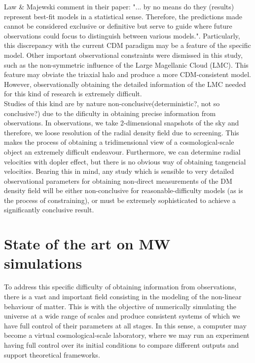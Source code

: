 Law \& Majewski comment in their paper: "... by no means do they (results) represent best-fit models in a statistical sense. Therefore, the predictions made cannot be considered exclusive or definitive but serve to guide where future observations could focus to distinguish between various models.". 
Particularly, this discrepancy with the current CDM paradigm may be a feature of the specific model. 
Other important observational constraints were dismissed in this study, such as the non-symmetric influence of the Large Magellanic Cloud (LMC). 
This feature may obviate the triaxial halo and produce a more CDM-consistent model. 
However, observationally obtaining the detailed information of the LMC needed for this kind of research is extremely difficult.\\

Studies of this kind are by nature non-conclusive(deterministic?, not so conclusive?) due to the dificulty in obtaining precise information from observations. 
In observations, we take 2-dimensional snapshots of the sky and therefore, we loose resolution of the radial density field due to screening. 
This makes the process of obtaining  a tridimensional view of a cosmological-scale object an extremely difficult endeavour. 
Furthermore, we can determine radial velocities with dopler effect, but there is no obvious way of obtaining tangencial velocities. 
Bearing this in mind, any study which is sensible to very detailed observational parameters for obtaining non-direct measurements of the DM density field will be either non-conclusive for reasonable-difficulty models (as is the process of constraining), or must be extremely sophisticated to achieve a significantly conclusive result.\\

\section{State of the art on MW simulations}
To address this specific difficulty of obtaining information from observations, there is a vast and important field consisting in the modeling of the non-linear behaviour of matter. 
This is with the objective of numerically simulating the universe at a wide range of scales and produce consistent systems of which we have  full control of their parameters at all stages. 
In this sense, a computer may become a virtual cosmological-scale laboratory, where we may run an experiment having full control over its initial conditions to compare different outputs and support theoretical frameworks. \\

